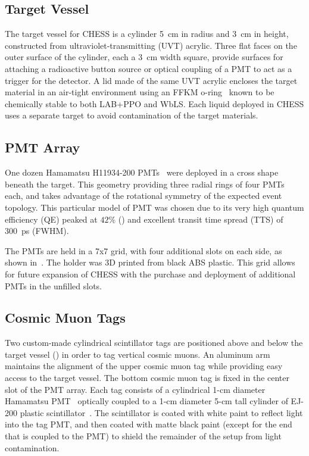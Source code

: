 \subsection{Target Vessel}
The target vessel for CHESS is a cylinder 5~cm in radius and 3~cm in height, constructed from ultraviolet-transmitting (UVT) acrylic. 
Three flat faces on the outer surface of the cylinder, each a 3~cm width square, provide surfaces for attaching a radioactive button source or optical coupling of a PMT to act as a trigger for the detector. 
A lid made of the same UVT acrylic encloses the target material in an air-tight environment using an FFKM o-ring~\cite{cog-oring} known to be chemically stable to both LAB+PPO and WbLS. 
Each liquid deployed in CHESS uses a separate target to avoid contamination of the target materials.

\subsection{PMT Array}
\label{pmtarray}

One dozen Hamamatsu H11934-200 PMTs~\cite{h11934} were deployed in a cross shape beneath the target.
This geometry providing three radial rings of four PMTs each, and takes advantage of the rotational symmetry of the expected event topology. 
This particular model of PMT was chosen due to its very high quantum efficiency (QE) peaked at $42\%$ () and excellent transit time spread (TTS) of 300~ps (FWHM).

The PMTs are held in a 7x7 grid, with four additional slots on each side, as shown in~. 
The holder was 3D printed from black ABS plastic.
This grid allows for future expansion of CHESS with the purchase and deployment of additional PMTs in the unfilled slots.

\subsection{Cosmic Muon Tags}

Two custom-made cylindrical scintillator tags are positioned above and below the target vessel () in order to tag vertical cosmic muons.  
An aluminum arm maintains the alignment of the upper cosmic muon tag while providing easy access to the target vessel.
The bottom cosmic muon tag is fixed in the center slot of the PMT array. 
Each tag consists of a cylindrical 1-cm diameter Hamamatsu PMT~\cite{h3164} optically coupled to a 1-cm diameter 5-cm tall cylinder of EJ-200 plastic scintillator~\cite{ej200}.
The scintillator is coated with white paint to reflect light into the tag PMT, and then coated with matte black paint (except for the end that is coupled to the PMT) to shield the remainder of the setup from light contamination. 

